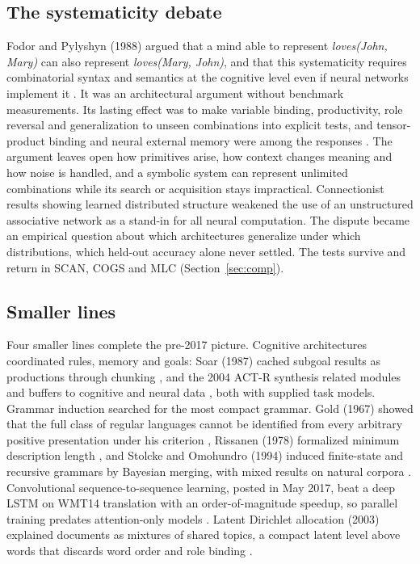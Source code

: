 \subsection{The systematicity debate}
Fodor and Pylyshyn (1988) argued that a mind able to represent \emph{loves(John, Mary)} can also represent \emph{loves(Mary, John)}, and that this systematicity requires combinatorial syntax and semantics at the cognitive level even if neural networks implement it \cite{pre41}. It was an architectural argument without benchmark measurements. Its lasting effect was to make variable binding, productivity, role reversal and generalization to unseen combinations into explicit tests, and tensor-product binding and neural external memory were among the responses \cite{pre27,pre31}. The argument leaves open how primitives arise, how context changes meaning and how noise is handled, and a symbolic system can represent unlimited combinations while its search or acquisition stays impractical. Connectionist results showing learned distributed structure weakened the use of an unstructured associative network as a stand-in for all neural computation. The dispute became an empirical question about which architectures generalize under which distributions, which held-out accuracy alone never settled. The tests survive and return in SCAN, COGS and MLC (Section~\ref{sec:comp}).

\subsection{Smaller lines}
Four smaller lines complete the pre-2017 picture. Cognitive architectures coordinated rules, memory and goals: Soar (1987) cached subgoal results as productions through chunking \cite{pre42}, and the 2004 ACT-R synthesis related modules and buffers to cognitive and neural data \cite{pre43}, both with supplied task models. Grammar induction searched for the most compact grammar. Gold (1967) showed that the full class of regular languages cannot be identified from every arbitrary positive presentation under his criterion \cite{pre48}, Rissanen (1978) formalized minimum description length \cite{pre49}, and Stolcke and Omohundro (1994) induced finite-state and recursive grammars by Bayesian merging, with mixed results on natural corpora \cite{pre50}. Convolutional sequence-to-sequence learning, posted in May 2017, beat a deep LSTM on WMT14 translation with an order-of-magnitude speedup, so parallel training predates attention-only models \cite{pre51}. Latent Dirichlet allocation (2003) explained documents as mixtures of shared topics, a compact latent level above words that discards word order and role binding \cite{pre56}.

